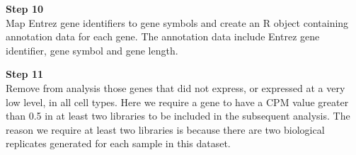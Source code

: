 \documentclass[]{book}
\newenvironment{Shaded}{\begin{snugshade}}{\end{snugshade}}
\newcommand{\ControlFlowTok}[1]{\textcolor[rgb]{0.13,0.29,0.53}{\textbf{#1}}}
\newcommand{\DataTypeTok}[1]{\textcolor[rgb]{0.13,0.29,0.53}{#1}}
\newcommand{\DecValTok}[1]{\textcolor[rgb]{0.00,0.00,0.81}{#1}}
\newcommand{\FloatTok}[1]{\textcolor[rgb]{0.00,0.00,0.81}{#1}}
\newcommand{\KeywordTok}[1]{\textcolor[rgb]{0.13,0.29,0.53}{\textbf{#1}}}
\newcommand{\NormalTok}[1]{#1}
\newcommand{\OperatorTok}[1]{\textcolor[rgb]{0.81,0.36,0.00}{\textbf{#1}}}
\newcommand{\OtherTok}[1]{\textcolor[rgb]{0.56,0.35,0.01}{#1}}
\newcommand{\StringTok}[1]{\textcolor[rgb]{0.31,0.60,0.02}{#1}}
\begin{document}
\textbf{Step 10}\\

Map Entrez gene identifiers to gene symbols and create an R object containing annotation data for each gene. The annotation data include Entrez gene identifier, gene symbol and gene length.

\begin{Shaded}
\end{Shaded}

\textbf{Step 11}\\

Remove from analysis those genes that did not express, or expressed at a very low level, in all cell types. Here we require a gene to have a CPM value greater than 0.5 in at least two libraries to be included in the subsequent analysis. The reason we require at least two libraries is because there are two biological replicates generated for each sample in this dataset.

\begin{Shaded}
\end{Shaded}
\end{document}
